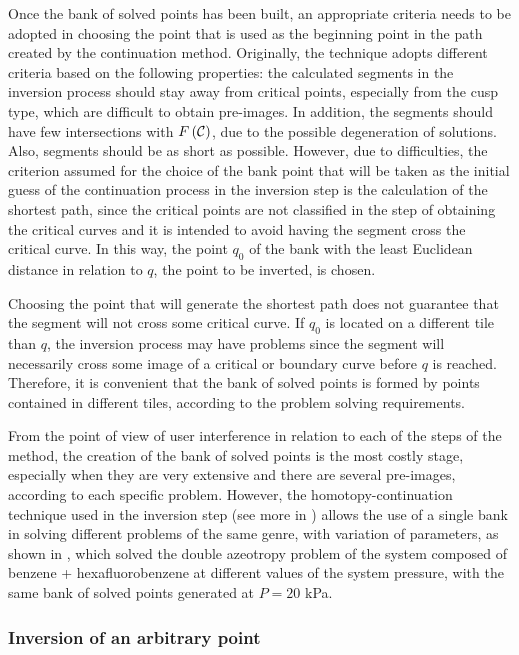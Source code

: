 \documentclass[journal=iecred,manuscript=article]{achemso}
\theoremstyle{definition}
\theoremstyle{remark}
\begin{document}
Once  the bank of solved points has been built,
 an appropriate criteria needs to be adopted in choosing the point that is  used as the beginning point in the path 
 created by the continuation method. Originally, the technique adopts different criteria based on the following properties: the calculated segments in the inversion process should stay away from critical points, especially from  the 
 cusp type, which are difficult to obtain pre-images. In addition, the segments should have few intersections with $ F\left({\cal C}\right) $, due to the possible degeneration of solutions. Also, segments should be as short as possible. However, due to difficulties, the criterion assumed for the choice of the bank point that will be taken as the initial guess of the continuation process in the inversion step is the calculation of the shortest path, since the critical points are not classified in the step of obtaining the critical curves and it is intended to avoid having the segment cross the critical curve. In this way, the point $ q_{0} $ of the bank with the least Euclidean distance in relation to $ q $, the point to be inverted, is chosen.

Choosing the point that will generate the shortest path does not guarantee that the segment will not cross some critical curve. If $ q_{0} $ is located on a different tile than $ q $, the inversion process may have problems since the segment will necessarily cross some image of a critical or boundary curve before $ q $ is reached. Therefore, it is convenient that the bank of solved points is formed by points contained in different tiles, according to the problem solving requirements.

From the point of view of user interference in relation to each of the steps of the method, the creation of the bank of solved points is the most costly stage, especially when they are very extensive and there are several pre-images, according to each specific problem. However, the homotopy-continuation technique used in the inversion step (see more in \citet{allgower}) allows the use of a single bank in solving different problems of the same genre, with variation of parameters, as shown in \citet{canadian}, which solved the double azeotropy problem of the system composed of benzene + hexafluorobenzene at different values of the system pressure, with the same bank of solved points generated at $ P = 20 $ kPa.
 
\subsubsection{Inversion of an arbitrary point}
\end{document}
